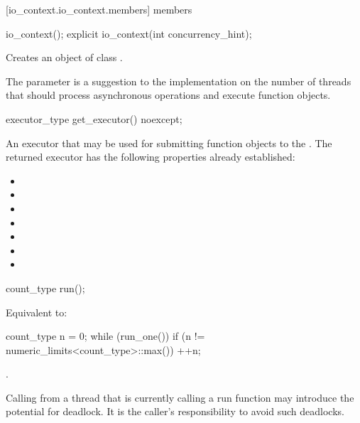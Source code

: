 [io_context.io_context.members]{ members}

%
\begin{itemdecl}
io_context();
explicit io_context(int concurrency_hint);
\end{itemdecl}

\begin{itemdescr}
\pnum
\effects Creates an object of class .

\pnum
\remarks The  parameter is a suggestion to the implementation on the number of threads that should process asynchronous operations and execute function objects.
\end{itemdescr}

%
\begin{itemdecl}
executor_type get_executor() noexcept;
\end{itemdecl}

\begin{itemdescr}
\pnum
\returns An executor that may be used for submitting function objects to the .
The returned executor has the following properties already established:
\begin{itemize}
\item
{}
\item
{}
\item
{}
\item
{}
\item
{}
\item
{}
\item
{}
\end{itemize}
\end{itemdescr}

%
\begin{itemdecl}
count_type run();
\end{itemdecl}

\begin{itemdescr}
\pnum
\effects Equivalent to:
\begin{codeblock}
count_type n = 0;
while (run_one())
  if (n != numeric_limits<count_type>::max())
    ++n;
\end{codeblock}

\pnum
\returns {}.

\pnum
\begin{note}
Calling  from a thread that is currently calling a run function
may introduce the potential for deadlock.
It is the caller's responsibility to avoid such deadlocks.
\end{note}
\end{itemdescr}

